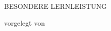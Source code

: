 
\renewcommand{\today}{\ifnum\number\day<10 0\fi \number\day.\space%
\ifcase \month \or Januar \or Februar \or März \or April \or Mai %
\or Juni \or Juli \or August \or September \or Oktober \or November \or Dezember \fi %
\number \year}

\begin{titlepage}
	\begin{addmargin}[-1cm]{-3cm}
    \begin{center}
        \large

		\mySchool \\ \vspace{0.6em} \myUni \\ \vspace{0.6em} \myFaculty \\ \vspace{0.6em} \myDepartment{} \\

        \hfill

        \vfill

        \begingroup
            \color{Maroon}\LARGE{\spacedallcaps{\myTitle}} \\ \bigskip
        \endgroup


        \vfill \bigskip

        {\Huge BESONDERE LERNLEISTUNG} \vfill\medskip




		vorgelegt von\\\vfill

        \textbf{\myName}\\
		\mySubject{}\vfill%


\end{center}
\end{addmargin}
\end{titlepage}
